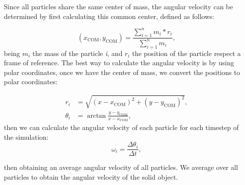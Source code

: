 Since all particles share the same center of mass, the angular velocity can be determined by first calculating this common center, defined as follows:

\begin{equation}
  (x_{\mathrm{COM}}, y_{\mathrm{COM}}) = \displaystyle\frac{\sum^{n}_{i=1} m_i * r_i}{\sum^{n}_{i=1} m_i},
  \label{eq:centerofmass}
\end{equation}
being $m_i$ the mass of the particle \textit{i}, and $r_i$ the position of the particle respect a frame of reference. The best way to calculate the angular velocity is by using polar coordinates, once we have the center of mass, we convert the positions to polar coordinates:

\begin{align}
  r_i & = \sqrt{(x - x_{\mathrm{COM}})^2 + (y - y_{\mathrm{COM}})^2},\\ 
  \theta _i &= \arctan{\frac{y - y_{\mathrm{COM}}}{x - x_{\mathrm{COM}}}},
\end{align}
then we can calculate the angular velocity of each particle for each timestep of the simulation:
\begin{equation}
  \omega _i = \frac{\Delta \theta _i}{\Delta t},
  \label{eq:angularvelocity}
\end{equation}

then obtaining an average angular velocity of all particles. We average over all particles to obtain the angular velocity of the solid object.

